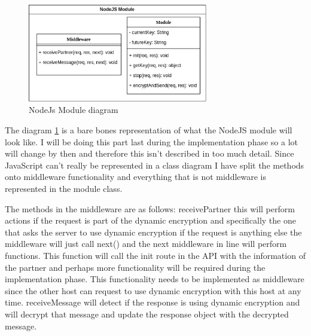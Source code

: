 \begin{figure}[!h]
  \centering
      \includegraphics[width=0.7\textwidth]{Figures/NodeJsModule.jpg}
  \caption[NodeJS Module diagram]{NodeJs Module diagram}
  \label{fig:mynodemoduleclass}
\end{figure}

\FloatBarrier

The diagram \ref{fig:mynodemoduleclass} is a bare bones representation of what the NodeJS module will look like. I will be doing this part last during the implementation phase so a lot will change by then and therefore this isn't described in too much detail. Since JavaScript can't really be represented in a class diagram I have split the methods onto middleware functionality and everything that is not middleware is represented in the module class.

The methods in the middleware are as follows:
receivePartner this will perform actions if the request is part of the dynamic encryption and specifically the one that asks the server to use dynamic encryption if the request is anything else the middleware will just call next() and the next middleware in line will perform functions. This function will call the init route in the API with the information of the partner and perhaps more functionality will be required during the implementation phase. This functionality needs to be implemented as middleware since the other host can request to use dynamic encryption with this host at any time.
receiveMessage will detect if the response is using dynamic encryption and will decrypt that message and update the response object with the decrypted message.

